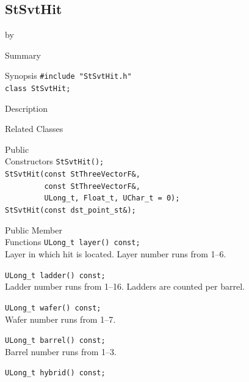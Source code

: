 \documentclass[twoside]{article}
\newcommand{\entrylabel}[1]{\mbox{\textbf{{#1}}}\hfil}%
\newenvironment{entry}
{\begin{list}{}%
    {\renewcommand{\makelabel}{\entrylabel}%
     \setlength{\labelwidth}{90pt}%
     \setlength{\leftmargin}{\labelwidth}
     \advance\leftmargin by \labelsep%
      }%
    }%
  {\end{list}}
\newcommand{\Entrylabel}[1]%
{\raisebox{0pt}[1ex][0pt]{\makebox[\labelwidth][l]%
    {\parbox[t]{\labelwidth}{\hspace{0pt}\textbf{{#1}}}}}}
\newenvironment{Entry}%
{\renewcommand{\entrylabel}{\Entrylabel}\begin{entry}}%
  {\end{entry}}
\begin{document}
\subsection{StSvtHit}
\label{sec:StSvtHit}
\begin{Entry}
\item[Summary]
\item[Synopsis]
    \verb+#include "StSvtHit.h"+\\
    \verb+class StSvtHit;+\\
\item[Description]
\item[Related Classes]
\item[Public\\ Constructors]
    \verb+StSvtHit();+\\
    \verb+StSvtHit(const StThreeVectorF&,+\\
    \verb+         const StThreeVectorF&,+\\
    \verb+         ULong_t, Float_t, UChar_t = 0);+\\
    \verb+StSvtHit(const dst_point_st&);+\\
\item[Public Member\\ Functions]
    \verb+ULong_t layer() const;+\\
    Layer in which hit is located. Layer number runs from 1--6.

    \verb+ULong_t ladder() const;+\\
    Ladder number runs from 1--16. Ladders
    are counted per barrel.
    
    \verb+ULong_t wafer() const;+\\
    Wafer number runs from 1--7.
    
    \verb+ULong_t barrel() const;+\\
    Barrel number runs from 1--3.
    
    \verb+ULong_t hybrid() const;+\\
\end{Entry}
\clearpage
\end{document}
